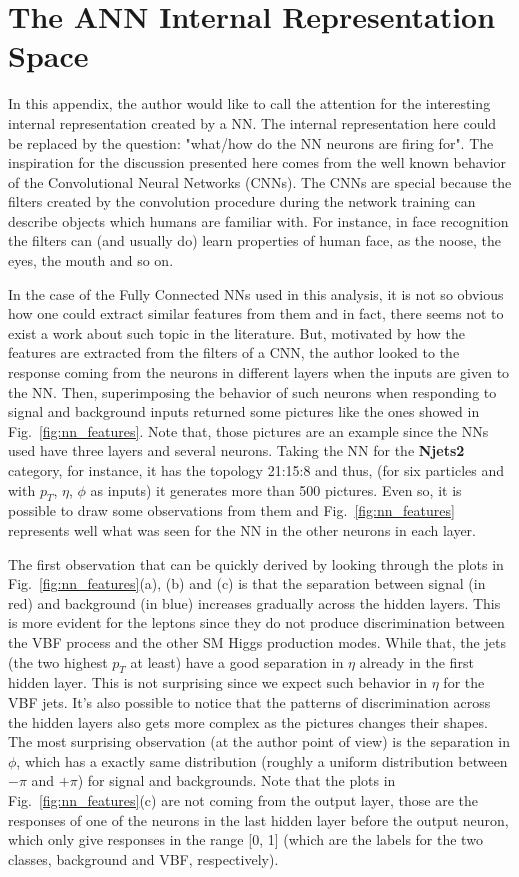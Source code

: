 \chapter{The ANN Internal Representation Space}
In this appendix, the author would like to call the attention for the interesting internal representation created by a NN. The internal representation here could be replaced by the question: "what/how do the NN neurons are firing for". The inspiration for the discussion presented here comes from the well known behavior of the Convolutional Neural Networks (CNNs). The CNNs are special because the filters created by the convolution procedure during the network training can describe objects which humans are familiar with. For instance, in face recognition the filters can (and usually do) learn properties of human face, as the noose, the eyes, the mouth and so on.

In the case of the Fully Connected NNs used in this analysis, it is not so obvious how one could extract similar features from them and in fact, there seems not to exist a work about such topic in the literature. But, motivated by how the features are extracted from the filters of a CNN, the author looked to the response coming from the neurons in different layers when the inputs are given to the NN. Then, superimposing the behavior of such neurons when responding to signal and background inputs returned some pictures like the ones showed in Fig.~\ref{fig:nn_features}. Note that, those pictures are an example since the NNs used have three layers and several neurons. Taking the NN for the \textbf{Njets2} category, for instance, it has the topology 21:15:8 and thus, (for six particles and with $p_{T}$, $\eta$, $\phi$ as inputs) it generates more than 500 pictures. Even so, it is possible to draw some observations from them and Fig.~\ref{fig:nn_features} represents well what was seen for the NN in the other neurons in each layer.

The first observation that can be quickly derived by looking through the plots in Fig.~\ref{fig:nn_features}(a), (b) and (c) is that the separation between signal (in red) and background (in blue) increases gradually across the hidden layers. This is more evident for the leptons since they do not produce discrimination between the VBF process and the other SM Higgs production modes. While that, the jets (the two highest $p_{T}$ at least) have a good separation in $\eta$ already in the first hidden layer. This is not surprising since we expect such behavior in $\eta$ for the VBF jets. It's also possible to notice that the patterns of discrimination across the hidden layers also gets more complex as the pictures changes their shapes. The most surprising observation (at the author point of view) is the separation in $\phi$, which has a exactly same distribution (roughly a uniform distribution between $-\pi$ and $+\pi$) for signal and backgrounds. Note that the plots in Fig.~\ref{fig:nn_features}(c) are not coming from the output layer, those are the responses of one of the neurons in the last hidden layer before the output neuron, which only give responses in the range [0, 1] (which are the labels for the two classes, background and VBF, respectively).

